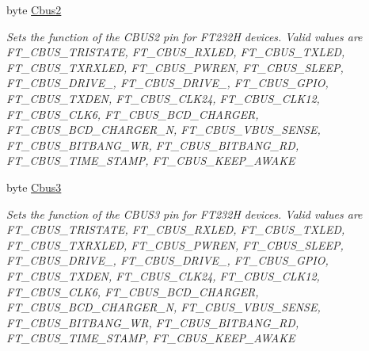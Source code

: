 \begin{DoxyCompactItemize}
byte \mbox{\hyperlink{class_f_t_d2_x_x___n_e_t_1_1_f_t_d_i_1_1_f_t___x_s_e_r_i_e_s___e_e_p_r_o_m___s_t_r_u_c_t_u_r_e_af98dcbd4684901ca14c3e293d2a97f9e}{Cbus2}}
\begin{DoxyCompactList}\small\item\em Sets the function of the C\+B\+U\+S2 pin for F\+T232H devices. Valid values are F\+T\+\_\+\+C\+B\+U\+S\+\_\+\+T\+R\+I\+S\+T\+A\+TE, F\+T\+\_\+\+C\+B\+U\+S\+\_\+\+R\+X\+L\+ED, F\+T\+\_\+\+C\+B\+U\+S\+\_\+\+T\+X\+L\+ED, F\+T\+\_\+\+C\+B\+U\+S\+\_\+\+T\+X\+R\+X\+L\+ED, F\+T\+\_\+\+C\+B\+U\+S\+\_\+\+P\+W\+R\+EN, F\+T\+\_\+\+C\+B\+U\+S\+\_\+\+S\+L\+E\+EP, F\+T\+\_\+\+C\+B\+U\+S\+\_\+\+D\+R\+I\+V\+E\+\_, F\+T\+\_\+\+C\+B\+U\+S\+\_\+\+D\+R\+I\+V\+E\+\_, F\+T\+\_\+\+C\+B\+U\+S\+\_\+\+G\+P\+IO, F\+T\+\_\+\+C\+B\+U\+S\+\_\+\+T\+X\+D\+EN, F\+T\+\_\+\+C\+B\+U\+S\+\_\+\+C\+L\+K24, F\+T\+\_\+\+C\+B\+U\+S\+\_\+\+C\+L\+K12, F\+T\+\_\+\+C\+B\+U\+S\+\_\+\+C\+L\+K6, F\+T\+\_\+\+C\+B\+U\+S\+\_\+\+B\+C\+D\+\_\+\+C\+H\+A\+R\+G\+ER, F\+T\+\_\+\+C\+B\+U\+S\+\_\+\+B\+C\+D\+\_\+\+C\+H\+A\+R\+G\+E\+R\+\_\+N, F\+T\+\_\+\+C\+B\+U\+S\+\_\+\+V\+B\+U\+S\+\_\+\+S\+E\+N\+SE, F\+T\+\_\+\+C\+B\+U\+S\+\_\+\+B\+I\+T\+B\+A\+N\+G\+\_\+\+WR, F\+T\+\_\+\+C\+B\+U\+S\+\_\+\+B\+I\+T\+B\+A\+N\+G\+\_\+\+RD, F\+T\+\_\+\+C\+B\+U\+S\+\_\+\+T\+I\+M\+E\+\_\+\+S\+T\+A\+MP, F\+T\+\_\+\+C\+B\+U\+S\+\_\+\+K\+E\+E\+P\+\_\+\+A\+W\+A\+KE \end{DoxyCompactList}\item 
byte \mbox{\hyperlink{class_f_t_d2_x_x___n_e_t_1_1_f_t_d_i_1_1_f_t___x_s_e_r_i_e_s___e_e_p_r_o_m___s_t_r_u_c_t_u_r_e_adc0ecaac088a19f09dda0788ff095293}{Cbus3}}
\begin{DoxyCompactList}\small\item\em Sets the function of the C\+B\+U\+S3 pin for F\+T232H devices. Valid values are F\+T\+\_\+\+C\+B\+U\+S\+\_\+\+T\+R\+I\+S\+T\+A\+TE, F\+T\+\_\+\+C\+B\+U\+S\+\_\+\+R\+X\+L\+ED, F\+T\+\_\+\+C\+B\+U\+S\+\_\+\+T\+X\+L\+ED, F\+T\+\_\+\+C\+B\+U\+S\+\_\+\+T\+X\+R\+X\+L\+ED, F\+T\+\_\+\+C\+B\+U\+S\+\_\+\+P\+W\+R\+EN, F\+T\+\_\+\+C\+B\+U\+S\+\_\+\+S\+L\+E\+EP, F\+T\+\_\+\+C\+B\+U\+S\+\_\+\+D\+R\+I\+V\+E\+\_, F\+T\+\_\+\+C\+B\+U\+S\+\_\+\+D\+R\+I\+V\+E\+\_, F\+T\+\_\+\+C\+B\+U\+S\+\_\+\+G\+P\+IO, F\+T\+\_\+\+C\+B\+U\+S\+\_\+\+T\+X\+D\+EN, F\+T\+\_\+\+C\+B\+U\+S\+\_\+\+C\+L\+K24, F\+T\+\_\+\+C\+B\+U\+S\+\_\+\+C\+L\+K12, F\+T\+\_\+\+C\+B\+U\+S\+\_\+\+C\+L\+K6, F\+T\+\_\+\+C\+B\+U\+S\+\_\+\+B\+C\+D\+\_\+\+C\+H\+A\+R\+G\+ER, F\+T\+\_\+\+C\+B\+U\+S\+\_\+\+B\+C\+D\+\_\+\+C\+H\+A\+R\+G\+E\+R\+\_\+N, F\+T\+\_\+\+C\+B\+U\+S\+\_\+\+V\+B\+U\+S\+\_\+\+S\+E\+N\+SE, F\+T\+\_\+\+C\+B\+U\+S\+\_\+\+B\+I\+T\+B\+A\+N\+G\+\_\+\+WR, F\+T\+\_\+\+C\+B\+U\+S\+\_\+\+B\+I\+T\+B\+A\+N\+G\+\_\+\+RD, F\+T\+\_\+\+C\+B\+U\+S\+\_\+\+T\+I\+M\+E\+\_\+\+S\+T\+A\+MP, F\+T\+\_\+\+C\+B\+U\+S\+\_\+\+K\+E\+E\+P\+\_\+\+A\+W\+A\+KE \end{DoxyCompactList}\item 

\end{DoxyCompactItemize}
